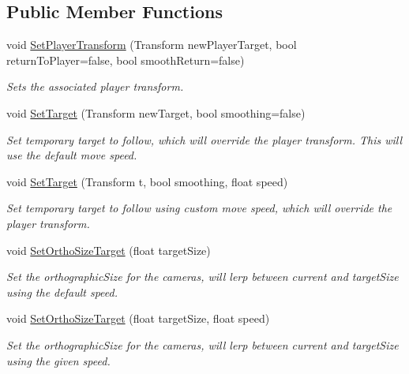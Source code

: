 \subsection*{Public Member Functions}
\begin{DoxyCompactItemize}
\item 
void \hyperlink{class_player_camera_ab00e29987f641e819d30afd424905a83}{Set\+Player\+Transform} (Transform new\+Player\+Target, bool return\+To\+Player=false, bool smooth\+Return=false)
\begin{DoxyCompactList}\small\item\em Sets the associated player transform. \end{DoxyCompactList}\item 
void \hyperlink{class_player_camera_a2fb61ce3ec200d7776f412ff76189f0d}{Set\+Target} (Transform new\+Target, bool smoothing=false)
\begin{DoxyCompactList}\small\item\em Set temporary target to follow, which will override the player transform. This will use the default move speed. \end{DoxyCompactList}\item 
void \hyperlink{class_player_camera_a237a72911a7603bb452a2d6fd4490a86}{Set\+Target} (Transform t, bool smoothing, float speed)
\begin{DoxyCompactList}\small\item\em Set temporary target to follow using custom move speed, which will override the player transform. \end{DoxyCompactList}\item 
void \hyperlink{class_player_camera_aac9819ce130c6466e191c967836245b6}{Set\+Ortho\+Size\+Target} (float target\+Size)
\begin{DoxyCompactList}\small\item\em Set the orthographic\+Size for the cameras, will lerp between current and target\+Size using the default speed. \end{DoxyCompactList}\item 
void \hyperlink{class_player_camera_a5044d1e08bab8950660ceaea431d26b9}{Set\+Ortho\+Size\+Target} (float target\+Size, float speed)
\begin{DoxyCompactList}\small\item\em Set the orthographic\+Size for the cameras, will lerp between current and target\+Size using the given speed. \end{DoxyCompactList}\item 

\end{DoxyCompactItemize}
